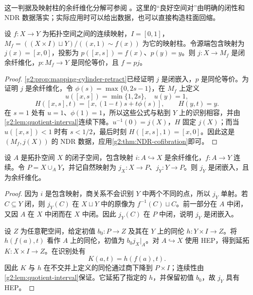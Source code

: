 这一判据及映射柱的余纤维化分解可参阅 \cite[第6章，第1--4节]{May1999}。这里的“良好空间对”由明确的闭性和 NDR 数据落实；实际应用时可以给出数据，也可以直接构造柱面回缩。

\begin{proposition}\label{g2:prop:mapping-cylinder-cofibration}
	设 \(f:X\to Y\) 为拓扑空间之间的连续映射，\(I=[0,1]\)，\(M_f=((X\times I)\sqcup Y)/((x,1)\sim f(x))\) 为它的映射柱。令源端包含映射为 \(j(x)=[x,0]\)，投影为 \(p([x,s])=f(x)\)、\(p(y)=y\)。则 \(j:X\to M_f\) 是闭余纤维化，\(p:M_f\to Y\) 是同伦等价，且 \(f=pj\)。
\end{proposition}
\begin{proof}
	\cref{g2:prop:mapping-cylinder-retract}已经证明 \(j\) 是闭嵌入，\(p\) 是同伦等价。为证明 \(j\) 是余纤维化，令 \(\phi(s)=\max\{0,2s-1\}\)，在 \(M_f\) 上定义
	\[
		u([x,s])=\min\{1,2s\},\quad u(y)=1,
	\]
	\[
		H([x,s],t)=[x,(1-t)s+t\phi(s)],\qquad H(y,t)=y.
	\]
	在 \(s=1\) 处有 \(u=1\)、\(\phi(1)=1\)，所以这些公式与粘到 \(Y\) 上的识别相容，并由\cref{g2:lem:quotient-interval}连续下降。\(u^{-1}(0)=j(X)\)，\(H\) 固定 \(j(X)\)；而当 \(u([x,s])<1\) 时有 \(s<1/2\)，最后时刻 \(H([x,s],1)=[x,0]\)。因此这是 \((M_f,j(X))\) 的 NDR 数据，应用\cref{g2:thm:NDR-cofibration}即可。
\end{proof}

\begin{proposition}\label{g2:prop:cofibration-pushout-stable}
	设 \(A\) 是拓扑空间 \(X\) 的闭子空间，包含映射 \(i:A\hookrightarrow X\) 是余纤维化，\(f:A\to Y\) 连续。令 \(P=X\cup_A Y\)，并记自然映射为 \(j_X:X\to P\)、\(j_Y:Y\to P\)。则 \(j_Y\) 是闭嵌入，且为余纤维化。
\end{proposition}
\begin{proof}
	因为 \(i\) 是包含映射，商关系不会识别 \(Y\) 中两个不同的点，所以 \(j_Y\) 单射。若 \(C\subseteq Y\) 闭，则 \(j_Y(C)\) 在 \(X\sqcup Y\) 中的原像为 \(f^{-1}(C)\sqcup C\)。前一部分在 \(A\) 中闭，又因 \(A\) 在 \(X\) 中闭而在 \(X\) 中闭。因此 \(j_Y(C)\) 在 \(P\) 中闭，说明 \(j_Y\) 是闭嵌入。

	设 \(Z\) 为任意靶空间，给定初值 \(b_0:P\to Z\) 及其在 \(Y\) 上的同伦 \(h:Y\times I\to Z\)。将 \(h(f(a),t)\) 看作 \(A\) 上的同伦，初值为 \(b_0j_X|_A\)。对 \(A\hookrightarrow X\) 使用 HEP，得到延拓 \(K:X\times I\to Z\)。在识别处有
	\[
		K(a,t)=h(f(a),t).
	\]
	因此 \(K\) 与 \(h\) 在不交并上定义的同伦通过商下降到 \(P\times I\)；连续性由\cref{g2:lem:quotient-interval}保证。它延拓了指定的 \(h\)，并保留初值 \(b_0\)，故 \(j_Y\) 具有 HEP。
\end{proof}

